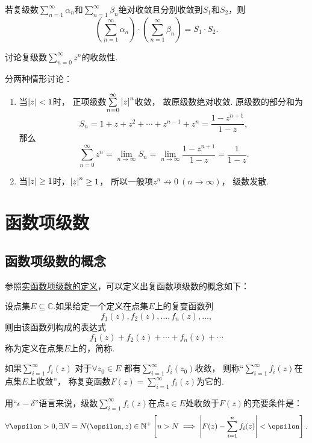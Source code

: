 \begin{theorem}
若复级数\(\sum\limits_{n=1}^\infty \alpha_n\)和\(\sum\limits_{n=1}^\infty \beta_n\)绝对收敛且分别收敛到\(S_1\)和\(S_2\)，则\[
\left( \sum\limits_{n=1}^\infty \alpha_n \right) \cdot \left( \sum\limits_{n=1}^\infty \beta_n \right) = S_1 \cdot S_2.
\]
\end{theorem}

\begin{example}[复等比级数]\label{example:解析级数的级数表示.复等比级数}
讨论复级数\(\sum\limits_{n=0}^\infty z^n\)的收敛性.
\begin{solution}
分两种情形讨论：\begin{enumerate}
\item 当\(\abs{z} < 1\)时，
正项级数\(\sum\limits_{n=0}^\infty \abs{z}^n\)收敛，
故原级数绝对收敛.
原级数的部分和为\[
S_n = 1 + z + z^2 + \dotsb + z^{n-1} + z^n = \frac{1-z^{n+1}}{1-z},
\]那么\[
\sum\limits_{n=0}^\infty z^n = \lim\limits_{n\to\infty} S_n = \lim\limits_{n\to\infty} \frac{1-z^{n+1}}{1-z} = \frac{1}{1-z}.
\]

\item 当\(\abs{z} \geq 1\)时，\(\abs{z}^n \geq 1\)，
所以一般项\(z^n \not\to 0\ (n\to\infty)\)，
级数发散.
\end{enumerate}
\end{solution}
\end{example}

\section{函数项级数}
\subsection{函数项级数的概念}
参照\hyperref[definition:无穷级数.实函数项级数的概念]{实函数项级数的定义}，可以定义出复函数项级数的概念如下：
\begin{definition}\label{definition:解析函数的级数表示.收敛级数}
设点集\(E \subseteq \mathbb{C}\).如果给定一个定义在点集\(E\)上的复变函数列\[
f_1(z), f_2(z), \dotsc, f_n(z), \dotsc,
\]则由该函数列构成的表达式\[
f_1(z) + f_2(z) + \dotsb + f_n(z) + \dotsb
\]称为定义在点集\(E\)上的，简称.

如果\(\sum\limits_{i=1}^\infty f_i(z)\)%
对于\(\forall z_0 \in E\)%
都有\(\sum\limits_{i=1}^\infty f_i(z_0)\)收敛，
则称“\(\sum\limits_{i=1}^\infty f_i(z)\)在点集\(E\)上收敛”，
称复变函数\(F(z) = \sum\limits_{i=1}^\infty f_i(z)\)为它的.
\end{definition}
用“\(\epsilon-\delta\)”语言来说，级数\(\sum\limits_{i=1}^\infty f_i(z)\)在点\(z \in E\)处收敛于\(F(z)\)的充要条件是：\[
\forall \epsilon > 0, \exists N = N(\epsilon, z) \in \mathbb{N}^+ \left[
n > N \implies \abs{F(z) - \sum\limits_{i=1}^n f_i(z)} < \epsilon
\right].
\]

